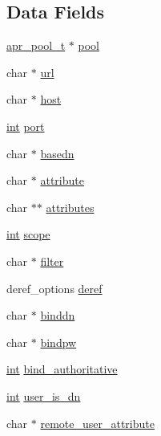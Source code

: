 \subsection*{Data Fields}
\begin{DoxyCompactItemize}
\item 
\hyperlink{structapr__pool__t}{apr\+\_\+pool\+\_\+t} $\ast$ \hyperlink{structauthn__ldap__config__t_a5fafa4ff9c66abe7e8ce67ef34513b9a}{pool}
\item 
char $\ast$ \hyperlink{structauthn__ldap__config__t_aa22d8a26d84e02d77db8d3c60b8d6abd}{url}
\item 
char $\ast$ \hyperlink{structauthn__ldap__config__t_af3c0d24ca8dbec68695aa3411f0da059}{host}
\item 
\hyperlink{pcre_8txt_a42dfa4ff673c82d8efe7144098fbc198}{int} \hyperlink{structauthn__ldap__config__t_ac8fc452025d2284638b77e53662ab054}{port}
\item 
char $\ast$ \hyperlink{structauthn__ldap__config__t_ab92a191af5c2d27fa814f7561330b1b0}{basedn}
\item 
char $\ast$ \hyperlink{structauthn__ldap__config__t_abd508ccfcfff8525420c483b3884f6a6}{attribute}
\item 
char $\ast$$\ast$ \hyperlink{structauthn__ldap__config__t_af9b688c49a5ddf2ae6da2e54e9815f1f}{attributes}
\item 
\hyperlink{pcre_8txt_a42dfa4ff673c82d8efe7144098fbc198}{int} \hyperlink{structauthn__ldap__config__t_abec7c0b1505db16bc3a7fa27576322e0}{scope}
\item 
char $\ast$ \hyperlink{structauthn__ldap__config__t_ad52f7f82044ff8879a783a232c0eb2d7}{filter}
\item 
deref\+\_\+options \hyperlink{structauthn__ldap__config__t_a62c37559d6a9ad5104a10c5a9899924a}{deref}
\item 
char $\ast$ \hyperlink{structauthn__ldap__config__t_a737e1939af76a5ec1aaeda9d49a626ff}{binddn}
\item 
char $\ast$ \hyperlink{structauthn__ldap__config__t_a0706f423c039542431004edad1cf6650}{bindpw}
\item 
\hyperlink{pcre_8txt_a42dfa4ff673c82d8efe7144098fbc198}{int} \hyperlink{structauthn__ldap__config__t_ad441216a2539ffeb0baaa621179dab0a}{bind\+\_\+authoritative}
\item 
\hyperlink{pcre_8txt_a42dfa4ff673c82d8efe7144098fbc198}{int} \hyperlink{structauthn__ldap__config__t_a09b9261f4c2f1ba2ee761458b80b87bf}{user\+\_\+is\+\_\+dn}
\item 
char $\ast$ \hyperlink{structauthn__ldap__config__t_a539d962d7bc8ada2b1ab708b925199bd}{remote\+\_\+user\+\_\+attribute}
$$
\end{DoxyCompactItemize}
